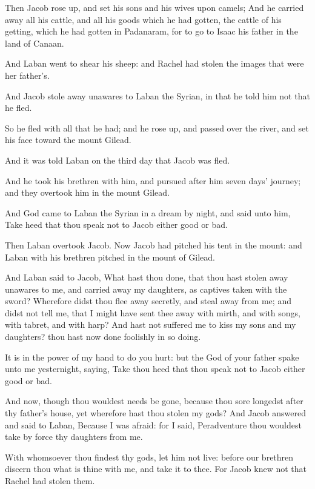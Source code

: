\verse Then Jacob rose up, and set his sons and his wives upon camels; \verse And he carried away all his cattle, and all his goods which he had gotten, the cattle of his getting, which he had gotten in Padanaram, for to go to Isaac his father in the land of Canaan.

\verse And Laban went to shear his sheep: and Rachel had stolen the images that were her father's.

\verse And Jacob stole away unawares to Laban the Syrian, in that he told him not that he fled.

\verse So he fled with all that he had; and he rose up, and passed over the river, and set his face toward the mount Gilead.

\verse And it was told Laban on the third day that Jacob was fled.

\verse And he took his brethren with him, and pursued after him seven days' journey; and they overtook him in the mount Gilead.

\verse And God came to Laban the Syrian in a dream by night, and said unto him, Take heed that thou speak not to Jacob either good or bad.

\verse Then Laban overtook Jacob. Now Jacob had pitched his tent in the mount: and Laban with his brethren pitched in the mount of Gilead.

\verse And Laban said to Jacob, What hast thou done, that thou hast stolen away unawares to me, and carried away my daughters, as captives taken with the sword?  \verse Wherefore didst thou flee away secretly, and steal away from me; and didst not tell me, that I might have sent thee away with mirth, and with songs, with tabret, and with harp?  \verse And hast not suffered me to kiss my sons and my daughters? thou hast now done foolishly in so doing.

\verse It is in the power of my hand to do you hurt: but the God of your father spake unto me yesternight, saying, Take thou heed that thou speak not to Jacob either good or bad.

\verse And now, though thou wouldest needs be gone, because thou sore longedst after thy father's house, yet wherefore hast thou stolen my gods?  \verse And Jacob answered and said to Laban, Because I was afraid: for I said, Peradventure thou wouldest take by force thy daughters from me.

\verse With whomsoever thou findest thy gods, let him not live: before our brethren discern thou what is thine with me, and take it to thee.  For Jacob knew not that Rachel had stolen them.

